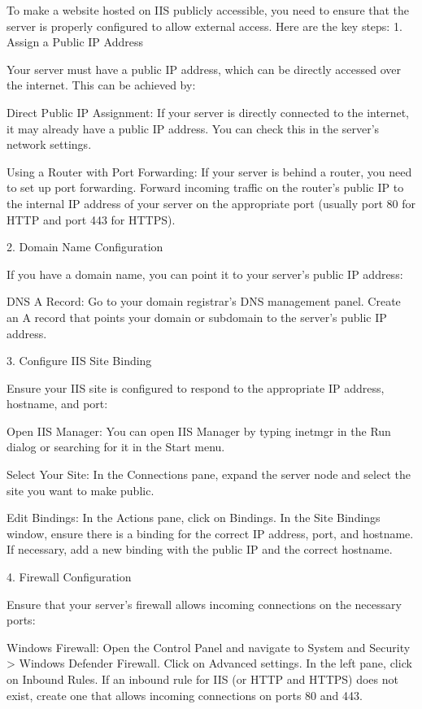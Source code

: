 To make a website hosted on IIS publicly accessible, you need to ensure that the server is properly configured to allow external access. Here are the key steps:
1. Assign a Public IP Address

Your server must have a public IP address, which can be directly accessed over the internet. This can be achieved by:

    Direct Public IP Assignment:
        If your server is directly connected to the internet, it may already have a public IP address. You can check this in the server's network settings.

    Using a Router with Port Forwarding:
        If your server is behind a router, you need to set up port forwarding. Forward incoming traffic on the router's public IP to the internal IP address of your server on the appropriate port (usually port 80 for HTTP and port 443 for HTTPS).

2. Domain Name Configuration

If you have a domain name, you can point it to your server's public IP address:

    DNS A Record:
        Go to your domain registrar's DNS management panel.
        Create an A record that points your domain or subdomain to the server's public IP address.

3. Configure IIS Site Binding

Ensure your IIS site is configured to respond to the appropriate IP address, hostname, and port:

    Open IIS Manager:
        You can open IIS Manager by typing inetmgr in the Run dialog or searching for it in the Start menu.

    Select Your Site:
        In the Connections pane, expand the server node and select the site you want to make public.

    Edit Bindings:
        In the Actions pane, click on Bindings.
        In the Site Bindings window, ensure there is a binding for the correct IP address, port, and hostname. If necessary, add a new binding with the public IP and the correct hostname.

4. Firewall Configuration

Ensure that your server's firewall allows incoming connections on the necessary ports:

    Windows Firewall:
        Open the Control Panel and navigate to System and Security > Windows Defender Firewall.
        Click on Advanced settings.
        In the left pane, click on Inbound Rules.
        If an inbound rule for IIS (or HTTP and HTTPS) does not exist, create one that allows incoming connections on ports 80 and 443.


